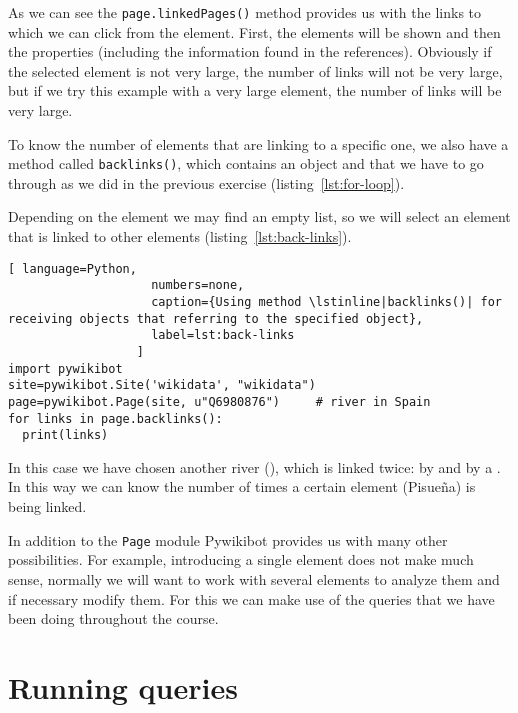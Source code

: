 As we can see the \lstinline|page.linkedPages()| method provides us with the links to which we can click from the element. 
First, the elements will be shown and then the properties (including the information found in the references). Obviously if the selected element is not very large, the number of links will not be very large, but if we try this example with a very large element, the number of links will be very large.

To know the number of elements that are linking to a specific one,
we also have a method called \lstinline|backlinks()|, which contains an object and that we have to go through as we did in the previous exercise (listing~\ref{lst:for-loop}).

Depending on the element we may find an empty list, so we will select an element that is linked to other elements (listing~\ref{lst:back-links}).

\begin{lstlisting}[ language=Python,
                    numbers=none,
                    caption={Using method \lstinline|backlinks()| for receiving objects that referring to the specified object},
                    label=lst:back-links
                  ]
import pywikibot
site=pywikibot.Site('wikidata', "wikidata")
page=pywikibot.Page(site, u"Q6980876")     # river in Spain
for links in page.backlinks():
  print(links)
\end{lstlisting}

In this case we have chosen another river (), 
which is linked twice: by  and by a . 
In this way we can know the number of times a certain element (Pisueña) is being linked.


In addition to the \lstinline|Page| module Pywikibot provides us with many other possibilities. 
For example, introducing a single element does not make much sense, normally we will want to work with several elements to analyze them and if necessary modify them. For this we can make use of the queries that we have been doing throughout the course.


\section{Running queries}
\label{sec:running queries eng}

